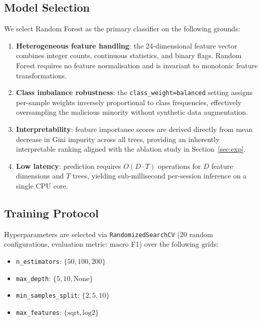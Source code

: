 \label{sec:method}

\subsection{Model Selection}

We select Random Forest \cite{breiman2001} as the primary classifier on the following
grounds:

\begin{enumerate}
  \item \textbf{Heterogeneous feature handling}: the 24-dimensional feature vector combines
        integer counts, continuous statistics, and binary flags. Random Forest requires no
        feature normalisation and is invariant to monotonic feature transformations.

  \item \textbf{Class imbalance robustness}: the \texttt{class\_weight=balanced} setting
        assigns per-sample weights inversely proportional to class frequencies, effectively
        oversampling the malicious minority without synthetic data augmentation.

  \item \textbf{Interpretability}: feature importance scores are derived directly from
        mean decrease in Gini impurity across all trees, providing an inherently
        interpretable ranking aligned with the ablation study in Section~\ref{sec:exp}.

  \item \textbf{Low latency}: prediction requires $O(D \cdot T)$ operations for $D$
        feature dimensions and $T$ trees, yielding sub-millisecond per-session inference on
        a single CPU core.
\end{enumerate}

\subsection{Training Protocol}

Hyperparameters are selected via \texttt{RandomizedSearchCV} (20 random configurations,
evaluation metric: macro F1) over the following grids:

\begin{itemize}
  \item \texttt{n\_estimators}: $\{50, 100, 200\}$
  \item \texttt{max\_depth}: $\{5, 10, \text{None}\}$
  \item \texttt{min\_samples\_split}: $\{2, 5, 10\}$
  \item \texttt{max\_features}: $\{\text{sqrt}, \text{log2}\}$
\end{itemize}

